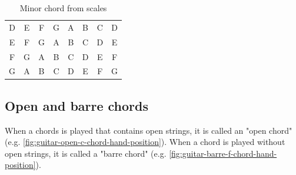 \begin{table}[h]
\begin{minipage}{0.45\textwidth}
\begin{tabular}{*{16}{c}}
			\multicolumn{2}{P{4mm}}{\ScaleRootCellFill D} & \multicolumn{2}{P{4mm}}{E} & \multicolumn{2}{P{4mm}}{\ScaleCellFill F} & \multicolumn{2}{P{4mm}}{G} & \multicolumn{2}{P{4mm}}{\ScaleCellFill A} & \multicolumn{2}{P{4mm}}{B\flat} & \multicolumn{2}{P{4mm}}{C} & \multicolumn{2}{P{4mm}}{D} \\
			\multicolumn{2}{P{4mm}}{\ScaleRootCellFill E} & \multicolumn{2}{P{4mm}}{F\sharp} & \multicolumn{2}{P{4mm}}{\ScaleCellFill G} & \multicolumn{2}{P{4mm}}{A} & \multicolumn{2}{P{4mm}}{\ScaleCellFill B} & \multicolumn{2}{P{4mm}}{C} & \multicolumn{2}{P{4mm}}{D} & \multicolumn{2}{P{4mm}}{E} \\
			\multicolumn{2}{P{4mm}}{\ScaleRootCellFill F} & \multicolumn{2}{P{4mm}}{G} & \multicolumn{2}{P{4mm}}{\ScaleCellFill A\flat} & \multicolumn{2}{P{4mm}}{B\flat} & \multicolumn{2}{P{4mm}}{\ScaleCellFill C} & \multicolumn{2}{P{4mm}}{D\flat} & \multicolumn{2}{P{4mm}}{E\flat} & \multicolumn{2}{P{4mm}}{F} \\
			\multicolumn{2}{P{4mm}}{\ScaleRootCellFill G} & \multicolumn{2}{P{4mm}}{A} & \multicolumn{2}{P{4mm}}{\ScaleCellFill B\flat} & \multicolumn{2}{P{4mm}}{C} & \multicolumn{2}{P{4mm}}{\ScaleCellFill D} & \multicolumn{2}{P{4mm}}{E\flat} & \multicolumn{2}{P{4mm}}{F} & \multicolumn{2}{P{4mm}}{G} \\
		\end{tabular}
		\caption{Minor chord from scales}
		\label{tab:guitar_minor_chords_from_scales}
	\end{minipage}
\end{table}

\newpage

\subsection{Open and barre chords}

When a chords is played that contains open strings, it is called an "open chord" (e.g. \autoref{fig:guitar-open-c-chord-hand-position}). When a chord is played without open strings, it is called a "barre chord" (e.g. \autoref{fig:guitar-barre-f-chord-hand-position}).

